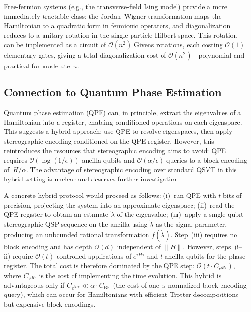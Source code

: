 Free-fermion systems (e.g., the transverse-field Ising
model) provide a more immediately tractable class: the
Jordan--Wigner transformation maps the Hamiltonian to a
quadratic form in fermionic operators, and diagonalization
reduces to a unitary rotation in the single-particle
Hilbert space.  This rotation can be implemented as a
circuit of $\mathcal{O}(n^2)$ Givens rotations, each
costing $\mathcal{O}(1)$ elementary gates, giving a total
diagonalization cost of $\mathcal{O}(n^2)$---polynomial
and practical for moderate~$n$.

\subsection{Connection to Quantum Phase Estimation}
\label{subsec:qpe-connection}

Quantum phase estimation (QPE) can, in principle, extract the
eigenvalues of a Hamiltonian into a register, enabling conditioned
operations on each eigenspace.  This suggests a hybrid approach:
use QPE to resolve eigenspaces, then apply stereographic encoding
conditioned on the QPE register.  However, this reintroduces the
resources that stereographic encoding aims to avoid: QPE requires
$\mathcal{O}(\log(1/\epsilon))$ ancilla qubits and
$\mathcal{O}(\alpha/\epsilon)$ queries to a block encoding
of~$H/\alpha$.  The advantage of stereographic encoding over
standard QSVT in this hybrid setting is unclear and deserves
further investigation.

A concrete hybrid protocol would proceed as follows:
(i)~run QPE with $t$ bits of precision, projecting the
system into an approximate eigenspace;
(ii)~read the QPE register to obtain an estimate
$\tilde{\lambda}$ of the eigenvalue;
(iii)~apply a single-qubit stereographic QSP sequence
on the ancilla using $\tilde{\lambda}$ as the signal
parameter, producing an unbounded rational transformation
$f(\tilde{\lambda})$.  Step~(iii) requires no block encoding
and has depth $\mathcal{O}(d)$ independent of $\|H\|$.
However, steps~(i--ii) require $\mathcal{O}(t)$ controlled
applications of $e^{iH\tau}$ and $t$ ancilla qubits for the
phase register.  The total cost is therefore dominated by
the QPE step: $\mathcal{O}(t \cdot C_{e^{iH\tau}})$, where
$C_{e^{iH\tau}}$ is the cost of implementing the time
evolution.  This hybrid is advantageous only if $C_{e^{iH\tau}}
	\ll \alpha \cdot C_{\mathrm{BE}}$ (the cost of one
$\alpha$-normalized block encoding query), which can occur
for Hamiltonians with efficient Trotter decompositions but
expensive block encodings.

